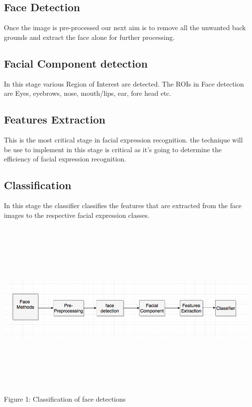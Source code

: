 \documentclass[12pt]{report}
\begin{document}
\subsection{Face Detection}

Once the image is pre-processed our next aim is to remove all the unwanted back grounds and extract the face alone for further processing.
\subsection{Facial Component detection}

In this stage various Region of Interest are detected. The ROIs in Face detection are Eyes, eyebrows, nose, mouth/lips, ear, fore head etc.
\subsection{Features Extraction}

This is the most critical stage in facial expression recognition. the technique will be use to implement in \cite{Raghuvanshi1971}this stage is critical as it's going to determine the efficiency of facial expression recognition.

\subsection{Classification}
In this stage the classifier classifies the features that are
extracted from the face images to the respective facial expression
classes.

\includegraphics[width = 15cm, height = 9cm ]{figure1.png}
Figure 1: Classification of face detections


 
\end{document}
